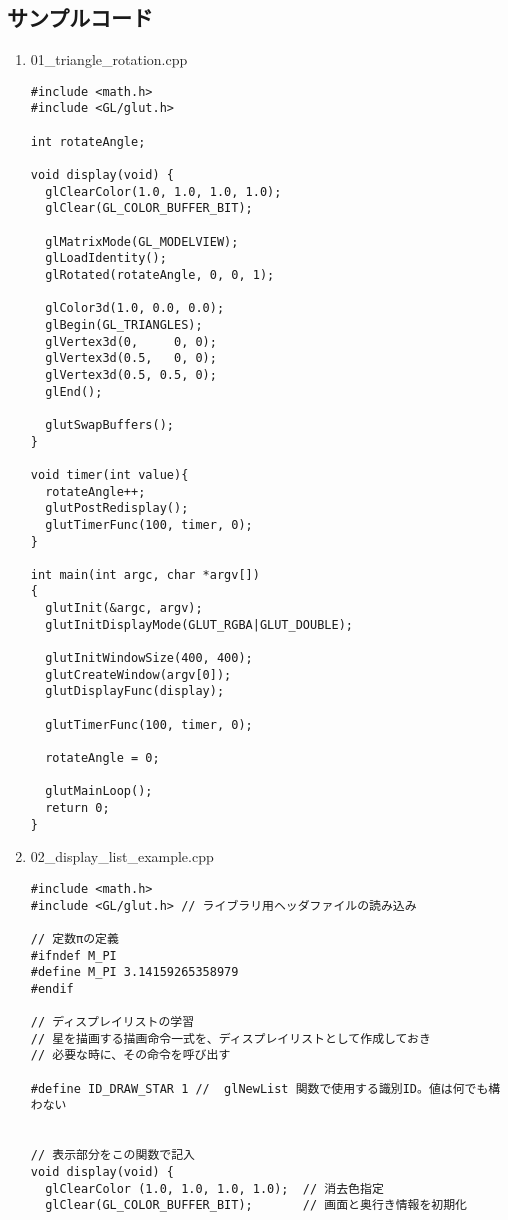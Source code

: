 \documentclass{scrartcl}
\begin{document}
\subsection{サンプルコード}
\label{sec:orgf44adc3}
\begin{enumerate}
\item 01\_triangle\_rotation.cpp\\
\begin{verbatim}
#include <math.h>
#include <GL/glut.h>

int rotateAngle;

void display(void) {
  glClearColor(1.0, 1.0, 1.0, 1.0);
  glClear(GL_COLOR_BUFFER_BIT);

  glMatrixMode(GL_MODELVIEW);
  glLoadIdentity();
  glRotated(rotateAngle, 0, 0, 1);

  glColor3d(1.0, 0.0, 0.0);
  glBegin(GL_TRIANGLES);
  glVertex3d(0,     0, 0);
  glVertex3d(0.5,   0, 0);
  glVertex3d(0.5, 0.5, 0);
  glEnd();

  glutSwapBuffers();
}

void timer(int value){
  rotateAngle++;
  glutPostRedisplay();
  glutTimerFunc(100, timer, 0);
}

int main(int argc, char *argv[])
{
  glutInit(&argc, argv);
  glutInitDisplayMode(GLUT_RGBA|GLUT_DOUBLE);

  glutInitWindowSize(400, 400);
  glutCreateWindow(argv[0]);
  glutDisplayFunc(display);

  glutTimerFunc(100, timer, 0);

  rotateAngle = 0;

  glutMainLoop();
  return 0;
}
\end{verbatim}
\item 02\_display\_list\_example.cpp\\
\begin{verbatim}
#include <math.h>
#include <GL/glut.h> // ライブラリ用ヘッダファイルの読み込み

// 定数πの定義
#ifndef M_PI
#define M_PI 3.14159265358979
#endif

// ディスプレイリストの学習
// 星を描画する描画命令一式を、ディスプレイリストとして作成しておき
// 必要な時に、その命令を呼び出す

#define ID_DRAW_STAR 1 //  glNewList 関数で使用する識別ID。値は何でも構わない


// 表示部分をこの関数で記入
void display(void) {        
  glClearColor (1.0, 1.0, 1.0, 1.0);  // 消去色指定
  glClear(GL_COLOR_BUFFER_BIT);       // 画面と奥行き情報を初期化


\end{verbatim}
\end{enumerate}
\end{document}
